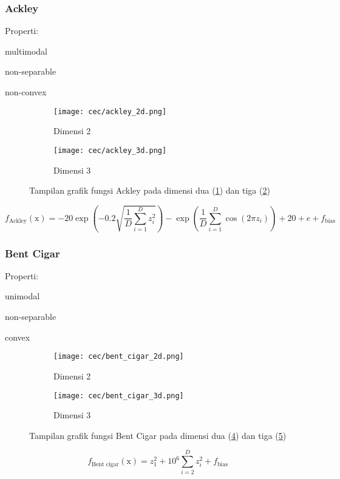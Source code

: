 \subsubsection{Ackley}
\noindent Properti:
\begin{packed_item}
  \item multimodal
  \item non-separable
  \item non-convex
\end{packed_item}
\begin{figure}[H]
	\centering
	\begin{subfigure}[b]{0.4\textwidth}
		\centering
		\texttt{[image: cec/ackley\_2d.png]}
		\caption{Dimensi 2}
		\label{fig:ackley-2d}
	\end{subfigure}
	\hfill
	\begin{subfigure}[b]{0.4\textwidth}
		\centering
		\texttt{[image: cec/ackley\_3d.png]}
		\caption{Dimensi 3}
		\label{fig:ackley-3d}
	\end{subfigure}
	\caption{Tampilan grafik fungsi Ackley pada dimensi dua (\cref{fig:ackley-2d}) dan tiga (\cref{fig:ackley-3d})}
	\label{fig:ackley}
\end{figure}
\begin{equation}
  f_{\text{Ackley}}(\mathrm{x})=-20\exp\left(-0.2\sqrt{\frac{1}{D}\sum_{i=1}^{D}z_i^2} \right)-\exp\left( \frac{1}{D}\sum_{i=1}^{D}\cos\left(2\pi z_i \right) \right) + 20 + e +f_{\text{bias}}
\end{equation}

\subsubsection{Bent Cigar}
\noindent Properti:
\begin{packed_item}
  \item unimodal
  \item non-separable
  \item convex
\end{packed_item}
\begin{figure}[H]
	\centering
	\begin{subfigure}[b]{0.4\textwidth}
		\centering
		\texttt{[image: cec/bent\_cigar\_2d.png]}
		\caption{Dimensi 2}
		\label{fig:bentcigar-2d}
	\end{subfigure}
	\hfill
	\begin{subfigure}[b]{0.4\textwidth}
		\centering
		\texttt{[image: cec/bent\_cigar\_3d.png]}
		\caption{Dimensi 3}
		\label{fig:bentcigar-3d}
	\end{subfigure}
	\caption{Tampilan grafik fungsi Bent Cigar pada dimensi dua (\cref{fig:bentcigar-2d}) dan tiga (\cref{fig:bentcigar-3d})}
	\label{fig:bentcigar}
\end{figure}
\begin{equation}
  f_{\text{Bent cigar}}(\mathrm{x})=z_1^2+10^6\sum_{i=2}^{D}z_i^2+f_{\text{bias}}
\end{equation}

